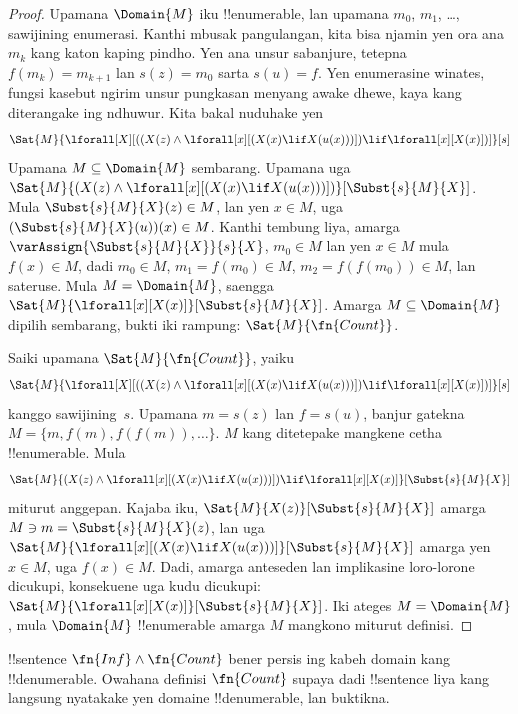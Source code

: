 \documentclass[../../../include/open-logic-section]{subfiles}
\begin{document}
\begin{proof}
Upamana $\Domain{M}$ iku !!{enumerable}, lan upamana
$m_0$, $m_1$, \dots, sawijining enumerasi. Kanthi
mbusak pangulangan, kita bisa njamin yen ora ana $m_k$
kang katon kaping pindho. Yen ana unsur sabanjure, tetepna $f(m_k) = m_{k+1}$
lan $s(z) = m_0$ sarta $s(u) = f$. Yen enumerasine
winates, fungsi kasebut ngirim unsur pungkasan menyang
awake dhewe, kaya kang diterangake ing ndhuwur. Kita bakal
nuduhake yen
\[
\Sat{M}{\lforall[X][((X(z) \land \lforall[x][(X(x) \lif X(u(x)))])
    \lif \lforall[x][X(x)])]}[s]
\]
Upamana $M \subseteq \Domain{M}$ sembarang. Upamana uga
$\Sat{M}{(X(z) \land \lforall[x][(X(x) \lif
X(u(x)))])}[\Subst{s}{M}{X}]$. Mula
$\Subst{s}{M}{X}(z) \in M$, lan yen $x \in M$, uga
$(\Subst{s}{M}{X}(u))(x) \in M$. Kanthi tembung liya,
amarga $\varAssign{\Subst{s}{M}{X}}{s}{X}$,
$m_0 \in M$ lan yen $x \in M$ mula $f(x) \in M$,
dadi $m_0 \in M$, $m_1 = f(m_0) \in M$,
$m_2 = f(f(m_0)) \in M$, lan sateruse.
Mula $M = \Domain{M}$, saengga
$\Sat{M}{\lforall[x][X(x)]}[\Subst{s}{M}{X}]$.
Amarga $M \subseteq \Domain{M}$ dipilih sembarang, bukti
iki rampung:
$\Sat{M}{\fn{Count}}$.

Saiki upamana $\Sat{M}{\fn{Count}}$, yaiku
\[
\Sat{M}{\lforall[X][((X(z) \land \lforall[x][(X(x) \lif X(u(x)))])
    \lif \lforall[x][X(x)])]}[s]
\]
kanggo sawijining~$s$. Upamana $m = s(z)$ lan
$f = s(u)$, banjur gatekna $M = \{m, f(m), f(f(m)), \dots\}$.
$M$ kang ditetepake mangkene cetha !!{enumerable}.
Mula
\[
\Sat{M}{(X(z) \land \lforall[x][(X(x) \lif X(u(x)))])
    \lif \lforall[x][X(x)]}[\Subst{s}{M}{X}]
\]
miturut anggepan. Kajaba iku,
$\Sat{M}{X(z)}[\Subst{s}{M}{X}]$ amarga
$M \ni m = \Subst{s}{M}{X}(z)$, lan uga
$\Sat{M}{\lforall[x][(X(x) \lif
X(u(x)))]}[\Subst{s}{M}{X}]$ amarga yen $x \in M$,
uga $f(x) \in M$. Dadi, amarga anteseden lan implikasine
loro-lorone dicukupi, konsekuene uga kudu dicukupi:
$\Sat{M}{\lforall[x][X(x)]}[\Subst{s}{M}{X}]$.
Iki ateges $M = \Domain{M}$, mula $\Domain{M}$
!!{enumerable} amarga $M$ mangkono miturut definisi.
\end{proof}

\begin{prob}
!!{sentence} $\fn{Inf} \land \fn{Count}$ bener persis
ing kabeh domain kang !!{denumerable}. Owahana definisi
$\fn{Count}$ supaya dadi !!{sentence} liya kang langsung
nyatakake yen domaine !!{denumerable}, lan buktikna.
\end{prob}
\end{document}
